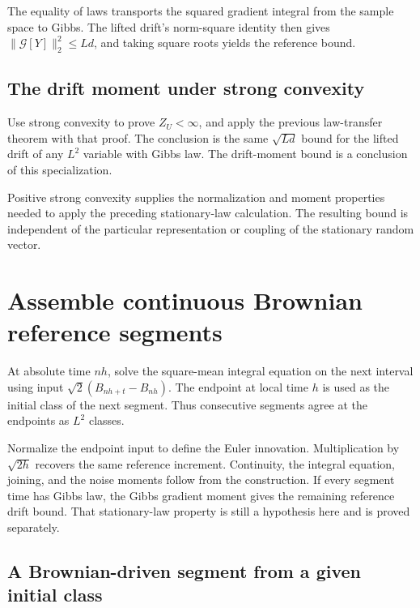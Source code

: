 \documentclass[11pt,a4paper]{report}
\begin{document}
The equality of laws transports the squared gradient integral from the sample space to Gibbs. The lifted drift's norm-square identity then gives \(\|\mathcal G[Y]\|_2^2\le Ld\), and taking square roots yields the reference bound.

\subsection{\texorpdfstring{The drift moment under strong convexity}{The drift moment under strong convexity}}
\label{report-step-UnadjustedLangevin-StationaryMoments-lean-2}


Use strong convexity to prove \(Z_U<\infty\), and apply the previous law-transfer theorem with that proof. The conclusion is the same \(\sqrt{Ld}\) bound for the lifted drift of any \(L^2\) variable with Gibbs law. The drift-moment bound is a conclusion of this specialization.



Positive strong convexity supplies the normalization and moment properties needed to apply the preceding stationary-law calculation. The resulting bound is independent of the particular representation or coupling of the stationary random vector.

\section{\texorpdfstring{Assemble continuous Brownian reference segments}{Assemble continuous Brownian reference segments}}
\label{proof-module-UnadjustedLangevin-BrownianReference-lean}


At absolute time \(nh\), solve the square-mean integral equation on the next interval using input \(\sqrt2(B_{nh+t}-B_{nh})\). The endpoint at local time \(h\) is used as the initial class of the next segment. Thus consecutive segments agree at the endpoints as \(L^2\) classes.



Normalize the endpoint input to define the Euler innovation. Multiplication by \(\sqrt{2h}\) recovers the same reference increment. Continuity, the integral equation, joining, and the noise moments follow from the construction. If every segment time has Gibbs law, the Gibbs gradient moment gives the remaining reference drift bound. That stationary-law property is still a hypothesis here and is proved separately.

\subsection{\texorpdfstring{A Brownian-driven segment from a given initial class}{A Brownian-driven segment from a given initial class}}
\label{report-step-UnadjustedLangevin-BrownianReference-lean-1}
\end{document}

